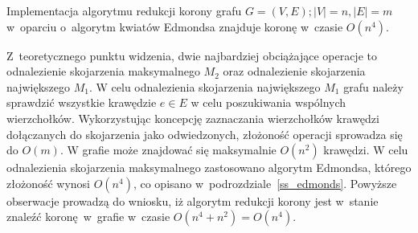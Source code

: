 \begin{theorem}
  Implementacja algorytmu redukcji korony grafu $G=(V,E); |V|=n,|E|=m$ 
  w~oparciu o~algorytm kwiatów Edmondsa znajduje koronę w~czasie $O(n^{4})$.
\end{theorem}
\begin{bproof}
  Z~teoretycznego punktu widzenia, dwie najbardziej obciążające operacje to
  odnalezienie skojarzenia maksymalnego $M_2$ oraz odnalezienie skojarzenia
  największego $M_1$.
  W celu odnalezienia skojarzenia największego $M_1$ grafu należy
  sprawdzić wszystkie krawędzie $e\in E$ w celu poszukiwania wspólnych
  wierzchołków.
  Wykorzystując koncepcję zaznaczania wierzchołków krawędzi dołączanych do 
  skojarzenia jako odwiedzonych, złożoność operacji sprowadza się do $O(m)$.
  W grafie może znajdować się maksymalnie $O(n^{2})$ krawędzi.
  W celu odnalezienia skojarzenia maksymalnego zastosowano algorytm Edmondsa,
  którego złożoność wynosi $O(n^{4})$, co opisano 
  w~podrozdziale~\ref{ss_edmonds}.
  Powyższe obserwacje prowadzą do wniosku, iż algorytm redukcji korony jest 
  w~stanie znaleźć koronę w~grafie w~czasie $O(n^{4} + n^{2})=O(n^{4})$.
\end{bproof}
